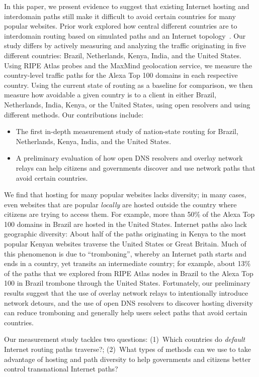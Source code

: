 In this paper, we present evidence to suggest that existing Internet
hosting and interdomain paths still make it difficult to avoid certain
countries for many popular websites. Prior work explored how central different countries are to interdomain 
routing based on simulated paths and an Internet topology~\cite{karlin2009nation}. 
Our study differs by actively measuring and analyzing the traffic originating in
five different countries: Brazil, Netherlands, Kenya, India, and the
United States.  Using RIPE Atlas probes and the MaxMind geolocation
service, we measure the country-level traffic paths for the Alexa Top
100 domains in each respective country.  Using the current state of
routing as a baseline for comparison, we then measure how avoidable a
given country is to a client in either Brazil, Netherlands, India,
Kenya, or the United States, using open resolvers and using different 
methods.  Our contributions include: 

\begin{itemize}
\item The first in-depth measurement study of
  nation-state routing for Brazil, Netherlands, Kenya, India, and the
  United States. 
\item A preliminary evaluation of how open DNS resolvers and overlay
  network relays can help citizens and governments discover and use
  network paths that avoid certain countries.
\end{itemize}
\noindent
We find that hosting for many popular websites lacks diversity; in many
cases, even websites that are popular {\em locally} are hosted outside
the country where citizens are trying to access them. For example, more
than 50\% of the Alexa Top 100 domains in Brazil are hosted in the
United States. Internet paths also lack geographic diversity: About half
of the paths originating in Kenya to the most popular Kenyan websites
traverse the United States or Great Britain. Much of this phenomenon is
due to ``tromboning'', whereby an Internet path starts and ends in a
country, yet transits an intermediate country; for example, about 13\%
of the paths that we explored from RIPE Atlas nodes in Brazil to the
Alexa Top 100 in Brazil trombone through the United States. Fortunately,
our preliminary results suggest that the use of overlay network relays
to intentionally introduce network detours, and the use of open DNS
resolvers to discover hosting diversity can reduce tromboning and
generally help users select paths that avoid certain countries.

Our measurement study tackles two questions: (1)~Which countries do {\em
  default} Internet routing paths traverse?; (2)~What types of methods
can we use to take advantage of hosting and path diversity to help governments
and citizens better control transnational Internet paths?

